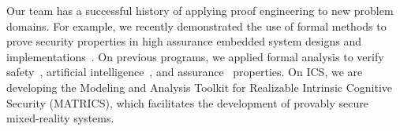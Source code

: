 Our team has a successful history of applying proof engineering to new problem domains. For example, we recently demonstrated the use of formal methods to prove security properties in high assurance embedded system designs and implementations~\cite{??}. On previous programs, we applied formal analysis to verify safety~\cite{??}, artificial intelligence~\cite{??}, and assurance~\cite{??} properties. On ICS, we are developing the Modeling and Analysis Toolkit for Realizable Intrinsic Cognitive Security (MATRICS), which facilitates the development of provably secure mixed-reality systems. %

